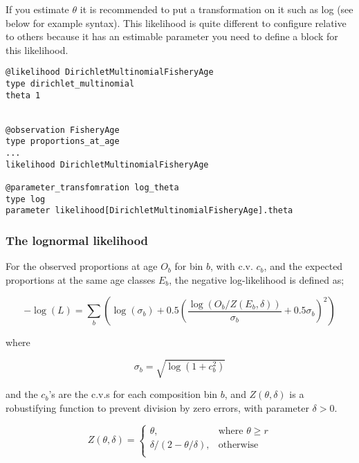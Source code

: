 If you estimate \(\theta\) it is recommended to put a transformation on it such as log (see below for example syntax). This likelihood is quite different to configure relative to others because it has an estimable parameter you need to define a  block for this likelihood.
{\small{\begin{verbatim}
@likelihood DirichletMultinomialFisheryAge
type dirichlet_multinomial
theta 1


@observation FisheryAge
type proportions_at_age
...
likelihood DirichletMultinomialFisheryAge

@parameter_transfomration log_theta
type log
parameter likelihood[DirichletMultinomialFisheryAge].theta

\end{verbatim}}}



\subsubsection*{The lognormal likelihood}

For the observed proportions at age $O_b$ for bin $b$, with c.v. $c_b$, and the expected proportions at the same age classes $E_b$, the negative log-likelihood is defined as;

\begin{equation}
- \log \left(L \right) = \sum\limits_b \left( \log \left( \sigma_b \right) + 0.5\left( \frac{\log \left(O_b / Z \left(E_b,\delta \right) \right)}{\sigma_b} + 0.5 \sigma_b \right)^2 \right)
\end{equation}

where

\begin{equation}
\sigma_b  = \sqrt{\log \left(1+c_b^2 \right)}
\end{equation}

and the $c_b$'s are the c.v.s for each composition bin $b$, and $Z \left(\theta,\delta \right)$ is a robustifying function to prevent division by zero errors, with parameter $\delta>0$.

\begin{equation}
Z \left(\theta,\delta \right) = \begin{cases}
\theta, & \text{where $\theta \ge r$} \\
\delta/\left( 2-\theta/\delta \right), & \text{otherwise} \\
\end{cases}
\end{equation}


